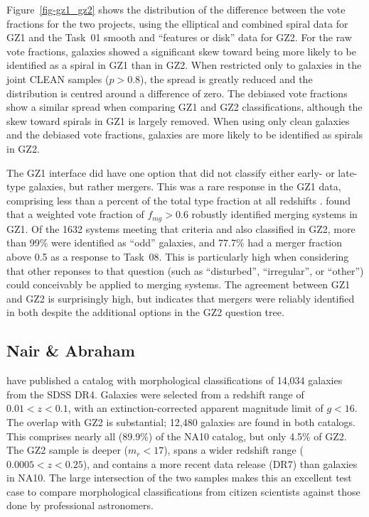 \documentclass[useAMS,usenatbib]{mn2e}
\begin{document}
Figure~\ref{fig-gz1_gz2} shows the distribution of the difference between the vote fractions for the two projects, using the elliptical and combined spiral data for GZ1 and the Task~01 smooth and ``features or disk'' data for GZ2. For the raw vote fractions, galaxies showed a significant skew toward being more likely to be identified as a spiral in GZ1 than in GZ2. When restricted only to galaxies in the joint CLEAN samples ($p>0.8$), the spread is greatly reduced and the distribution is centred around a difference of zero. The debiased vote fractions show a similar spread when comparing GZ1 and GZ2 classifications, although the skew toward spirals in GZ1 is largely removed. When using only clean galaxies and the debiased vote fractions, galaxies are more likely to be identified as spirals in GZ2. 

The GZ1 interface did have one option that did not classify either early- or late-type galaxies, but rather mergers. This was a rare response in the GZ1 data, comprising less than a percent of the total type fraction at all redshifts \citep{bam09}. \citet{dar10a} found that a weighted vote fraction of $f_{mg} > 0.6$ robustly identified merging systems in GZ1. Of the 1632 systems meeting that criteria and also classified in GZ2, more than 99\% were identified as ``odd'' galaxies, and 77.7\% had a merger fraction above 0.5 as a response to Task~08. This is particularly high when considering that other reponses to that question (such as ``disturbed'', ``irregular'', or ``other'') could conceivably be applied to merging systems. The agreement between GZ1 and GZ2 is surprisingly high, but indicates that mergers were reliably identified in both despite the additional options in the GZ2 question tree. 

\subsection{Nair \& Abraham}

\citet[][hereafter NA10]{nai10} have published a catalog with morphological classifications of 14,034 galaxies from the SDSS DR4. Galaxies were selected from a redshift range of $0.01<z<0.1$, with an extinction-corrected apparent magnitude limit of $g<16$. The overlap with GZ2 is substantial; 12,480 galaxies are found in both catalogs. This comprises nearly all (89.9\%) of the NA10 catalog, but only 4.5\% of GZ2. The GZ2 sample is deeper ($m_r<17$), spans a wider redshift range ($0.0005<z<0.25$), and contains a more recent data release (DR7) than galaxies in NA10. The large intersection of the two samples makes this an excellent test case to compare morphological classifications from citizen scientists against those done by professional astronomers.  
\end{document}

